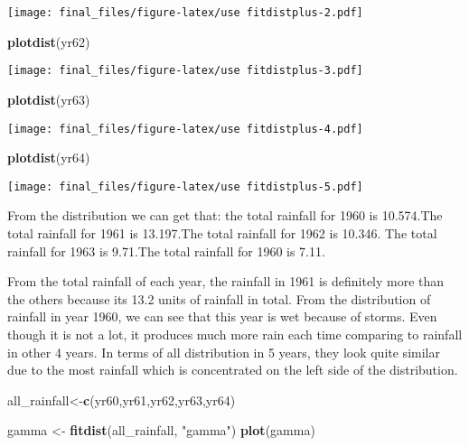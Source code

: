\documentclass[]{article}
\newenvironment{Shaded}{\begin{snugshade}}{\end{snugshade}}
\newcommand{\KeywordTok}[1]{\textcolor[rgb]{0.13,0.29,0.53}{\textbf{#1}}}
\newcommand{\StringTok}[1]{\textcolor[rgb]{0.31,0.60,0.02}{#1}}
\newcommand{\NormalTok}[1]{#1}
\begin{document}
\texttt{[image: final\_files/figure-latex/use fitdistplus-2.pdf]}

\begin{Shaded}
\begin{Highlighting}[]
\KeywordTok{plotdist}\NormalTok{(yr62)}
\end{Highlighting}
\end{Shaded}

\texttt{[image: final\_files/figure-latex/use fitdistplus-3.pdf]}

\begin{Shaded}
\begin{Highlighting}[]
\KeywordTok{plotdist}\NormalTok{(yr63)}
\end{Highlighting}
\end{Shaded}

\texttt{[image: final\_files/figure-latex/use fitdistplus-4.pdf]}

\begin{Shaded}
\begin{Highlighting}[]
\KeywordTok{plotdist}\NormalTok{(yr64)}
\end{Highlighting}
\end{Shaded}

\texttt{[image: final\_files/figure-latex/use fitdistplus-5.pdf]}

From the distribution we can get that: the total rainfall for 1960 is
10.574.The total rainfall for 1961 is 13.197.The total rainfall for 1962
is 10.346. The total rainfall for 1963 is 9.71.The total rainfall for
1960 is 7.11.

From the total rainfall of each year, the rainfall in 1961 is definitely
more than the others because its 13.2 units of rainfall in total. From
the distribution of rainfall in year 1960, we can see that this year is
wet because of storms. Even though it is not a lot, it produces much
more rain each time comparing to rainfall in other 4 years. In terms of
all distribution in 5 years, they look quite similar due to the most
rainfall which is concentrated on the left side of the distribution.

\begin{Shaded}
\begin{Highlighting}[]
\NormalTok{all_rainfall<-}\KeywordTok{c}\NormalTok{(yr60,yr61,yr62,yr63,yr64)}


\NormalTok{gamma <-}\StringTok{ }\KeywordTok{fitdist}\NormalTok{(all_rainfall, }\StringTok{"gamma"}\NormalTok{)}
\KeywordTok{plot}\NormalTok{(gamma)}
\end{Highlighting}
\end{Shaded}
\end{document}
